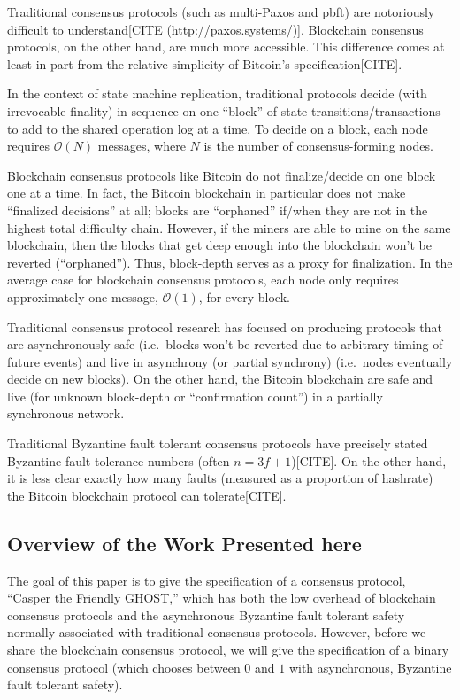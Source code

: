\documentclass{article}
\theoremstyle{definition}
\begin{document}
Traditional consensus protocols (such as multi-Paxos and pbft) are notoriously difficult to understand[CITE (http://paxos.systems/)]. Blockchain consensus protocols, on the other hand, are much more accessible. This difference comes at least in part from the relative simplicity of Bitcoin's specification[CITE].

In the context of state machine replication, traditional protocols decide (with irrevocable finality) in sequence on one ``block'' of state transitions/transactions to add to the shared operation log at a time. To decide on a block, each node requires $\mathcal{O}(N)$ messages, where $N$ is the number of consensus-forming nodes.

Blockchain consensus protocols like Bitcoin do not finalize/decide on one block one at a time. In fact, the Bitcoin blockchain in particular does not make ``finalized decisions'' at all; blocks are ``orphaned'' if/when they are not in the highest total difficulty chain. However, if the miners are able to mine on the same blockchain, then the blocks that get deep enough into the blockchain won't be reverted (``orphaned''). Thus, block-depth serves as a proxy for finalization. In the average case for blockchain consensus protocols, each node only requires approximately one message, $\mathcal{O}(1)$, for every block.

Traditional consensus protocol research has focused on producing protocols that are asynchronously safe (i.e.\ blocks won't be reverted due to arbitrary timing of future events) and live in asynchrony (or partial synchrony) (i.e.\ nodes eventually decide on new blocks). On the other hand, the Bitcoin blockchain are safe and live (for unknown block-depth or ``confirmation count'') in a partially synchronous network.

Traditional Byzantine fault tolerant consensus protocols have precisely stated Byzantine fault tolerance numbers (often $n = 3f + 1$)[CITE]. On the other hand, it is less clear exactly how many faults (measured as a proportion of hashrate) the Bitcoin blockchain protocol can tolerate[CITE].

\subsection{Overview of the Work Presented here}

The goal of this paper is to give the specification of a consensus protocol, ``Casper the Friendly GHOST,'' which has both the low overhead of blockchain consensus protocols and the asynchronous Byzantine fault tolerant safety normally associated with traditional consensus protocols. However, before we share the blockchain consensus protocol, we will give the specification of a binary consensus protocol (which chooses between $0$ and $1$ with asynchronous, Byzantine fault tolerant safety). 
\end{document}
